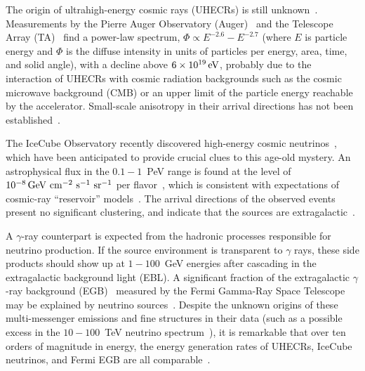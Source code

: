 \documentclass[aps,prd,onecolumn,superscriptaddress,11pt]{revtex4}
\begin{document}
The origin of ultrahigh-energy cosmic rays (UHECRs) is still unknown~\cite{Hillas84}. Measurements by the Pierre Auger Observatory (Auger)~\cite{Aab:2015bza} and the Telescope Array (TA)~\cite{TA_ICRC15} find a power-law spectrum, $\Phi\propto E^{-2.6}-E^{-2.7}$ (where $E$ is particle energy and $\Phi$ is the diffuse intensity in units of particles per energy, area, time, and solid angle), with a decline above $6\times{10}^{19}\,\rm eV$, probably due to the interaction of UHECRs with cosmic radiation backgrounds such as the cosmic microwave background (CMB) or an upper limit of the particle energy reachable by the accelerator. Small-scale anisotropy in their arrival directions has not been established~\cite{Aab:2015bza,TA_ICRC15}.

The IceCube Observatory recently discovered high-energy cosmic neutrinos~\cite{Halzen:2016gng,Aartsen:2013bka}, which have been anticipated to provide crucial clues to this age-old mystery. An astrophysical flux in the $0.1-1$~PeV range is found at the level of $10^{-8} \,\rm GeV~cm^{-2}~s^{-1}~sr^{-1}$ per flavor~\cite{Halzen:2016gng,Aartsen:2013bka,Aartsen:2016xlq, Aartsen:2016xlq2}, which is consistent with expectations of cosmic-ray ``reservoir'' models~\cite{Murase:2008yt,Kotera:2009ms,Loeb:2006tw,Murase:2013rfa}.  
The arrival directions of the observed events present no significant clustering, and indicate that the sources are extragalactic~\cite{Halzen:2016gng,Aartsen:2016xlq, Aartsen:2016xlq2}. 

A $\gamma$-ray counterpart is expected from the hadronic processes responsible for neutrino production.  If the source environment is transparent to $\gamma$ rays, these side products should show up at $1-100$~GeV energies after cascading in the extragalactic background light (EBL). A significant fraction of the extragalactic $\gamma$-ray background (EGB)~\cite{FermiBG,PhysRevLett.116.151105} measured by the Fermi Gamma-Ray Space Telescope may be explained by neutrino sources~\cite{Murase:2013rfa}. 
Despite the unknown origins of these multi-messenger emissions and fine structures in their data (such as a possible excess in the $10-100$~TeV neutrino spectrum~\cite{Halzen:2016gng}), it is remarkable that over ten orders of magnitude in energy, the energy generation rates of UHECRs, IceCube neutrinos, and Fermi EGB are all comparable~\cite{Murase:2013rfa,2016PhRvD..94j3006M}. 
\end{document}
